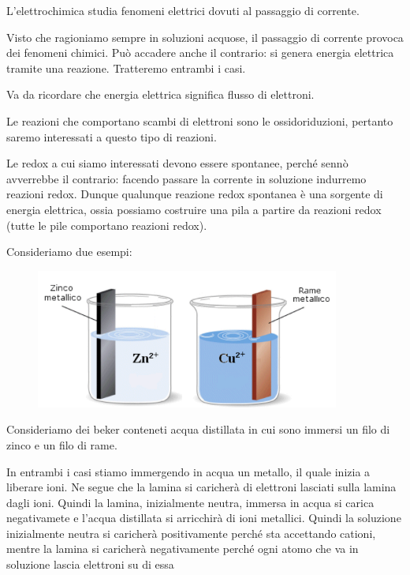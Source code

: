L'elettrochimica studia fenomeni elettrici dovuti al passaggio di corrente.

Visto che ragioniamo sempre in soluzioni acquose, il passaggio di corrente provoca dei fenomeni chimici. Può accadere anche il contrario: si genera energia elettrica tramite una reazione. Tratteremo entrambi i casi.

\vspace{0.2cm}Va da ricordare che energia elettrica significa flusso di elettroni.

Le reazioni che comportano scambi di elettroni sono le ossidoriduzioni, pertanto saremo interessati a questo tipo di reazioni.

Le redox a cui siamo interessati devono essere spontanee, perché sennò avverrebbe il contrario: facendo passare la corrente in soluzione indurremo reazioni redox. Dunque qualunque reazione redox spontanea è una sorgente di energia elettrica, ossia possiamo costruire una pila a partire da reazioni redox (tutte le pile comportano reazioni redox).

Consideriamo due esempi:

\begin{figure}[H]
    \centering
    \includegraphics[width=10cm]{immagini/piastre_metalliche.png}
\end{figure}

Consideriamo dei beker conteneti acqua distillata in cui sono immersi un filo di zinco e un filo di rame.

In entrambi i casi stiamo immergendo in acqua un metallo, il quale inizia a liberare ioni. Ne segue che la lamina si caricherà di elettroni lasciati sulla lamina dagli ioni. Quindi la lamina, inizialmente neutra, immersa in acqua si carica negativamete e l'acqua distillata si arricchirà di ioni metallici. Quindi la soluzione inizialmente neutra si caricherà positivamente perché sta accettando cationi, mentre la lamina si caricherà negativamente perché ogni atomo che va in soluzione lascia elettroni su di essa


